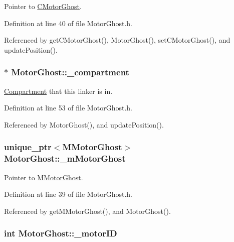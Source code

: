 Pointer to \hyperlink{classCMotorGhost}{C\+Motor\+Ghost}. 



Definition at line 40 of file Motor\+Ghost.\+h.



Referenced by get\+C\+Motor\+Ghost(), Motor\+Ghost(), set\+C\+Motor\+Ghost(), and update\+Position().

\hypertarget{classMotorGhost_a3a16b996a9a4a7e51735b410e65d339c}{
\subsubsection[{\+\_\+compartment}]{$\ast$ Motor\+Ghost\+::\+\_\+compartment\hspace{0.3cm}{\ttfamily [private]}}}\label{classMotorGhost_a3a16b996a9a4a7e51735b410e65d339c}


\hyperlink{classCompartment}{Compartment} that this linker is in. 



Definition at line 53 of file Motor\+Ghost.\+h.



Referenced by Motor\+Ghost(), and update\+Position().

\hypertarget{classMotorGhost_a651509682f0faffe9b8e2d77e652312b}{
\subsubsection[{\+\_\+m\+Motor\+Ghost}]{\setlength{\rightskip}{0pt plus 5cm}unique\+\_\+ptr$<${\bf M\+Motor\+Ghost}$>$ Motor\+Ghost\+::\+\_\+m\+Motor\+Ghost\hspace{0.3cm}{\ttfamily [private]}}}\label{classMotorGhost_a651509682f0faffe9b8e2d77e652312b}


Pointer to \hyperlink{classMMotorGhost}{M\+Motor\+Ghost}. 



Definition at line 39 of file Motor\+Ghost.\+h.



Referenced by get\+M\+Motor\+Ghost(), and Motor\+Ghost().

\hypertarget{classMotorGhost_a8af6f4cdc0bd8ab2300b6f4bba550f1c}{
\subsubsection[{\+\_\+motor\+I\+D}]{\setlength{\rightskip}{0pt plus 5cm}int Motor\+Ghost\+::\+\_\+motor\+I\+D\hspace{0.3cm}{\ttfamily [private]}}}\label{classMotorGhost_a8af6f4cdc0bd8ab2300b6f4bba550f1c}



